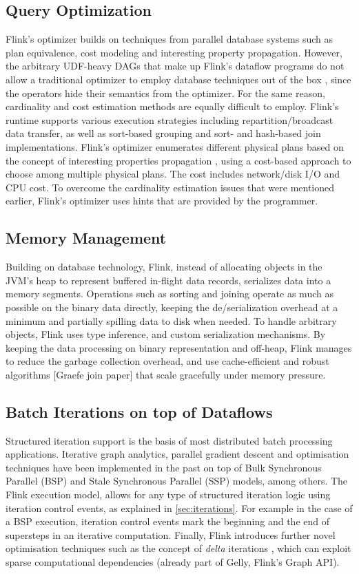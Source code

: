 \subsection{Query Optimization} 
Flink’s optimizer builds on techniques from parallel database systems such as plan equivalence, cost modeling and interesting property propagation. However, the arbitrary UDF-heavy DAGs that make up Flink’s dataflow programs do not allow a traditional optimizer to employ database techniques out of the box \cite{blackBoxes}, since the operators hide their semantics from the optimizer. For the same reason, cardinality and cost estimation methods are equally difficult to employ. Flink’s runtime supports various execution strategies including repartition/broadcast data transfer, as well as sort-based grouping and sort- and hash-based join implementations. Flink’s optimizer enumerates different physical plans based on the concept of interesting properties propagation \cite{scopeOptimizer}, using a cost-based approach to choose among multiple physical plans. The cost includes network/disk I/O and CPU cost. To overcome the cardinality estimation issues that were mentioned earlier,  Flink’s optimizer uses hints that are provided by the programmer.

\subsection{Memory Management} Building on database technology, Flink, instead of allocating objects in the JVM’s heap to represent buffered in-flight data records, serializes data into a  memory segments. Operations such as sorting and joining operate as much as possible on the binary data directly, keeping the de/serialization overhead at a minimum and partially spilling data to disk when needed. To handle arbitrary objects, Flink uses type inference, and  custom serialization mechanisms.  By keeping the data processing on binary representation and off-heap, Flink manages to reduce the garbage collection overhead, and use cache-efficient and robust algorithms [Graefe join paper] that scale gracefully under memory pressure.

\subsection{Batch Iterations on top of Dataflows}
\label{sec:batch-iterations}
Structured iteration support is the basis of most distributed batch processing applications. Iterative graph analytics, parallel gradient descent and optimisation techniques have been implemented in the past on top of Bulk Synchronous Parallel (BSP) and Stale Synchronous Parallel (SSP) models, among others. The Flink execution model, allows for any type of structured iteration logic using iteration control events, as explained in \autoref{sec:iterations}. For example in the case of a BSP execution, iteration control events mark the beginning and the end of supersteps in an iterative computation. Finally, Flink introduces further novel optimisation techniques such as the concept of \emph{delta} iterations \cite{DBLP:journals/pvldb/EwenTKM12}, which can exploit sparse computational dependencies (already part of Gelly, Flink's Graph API).  

